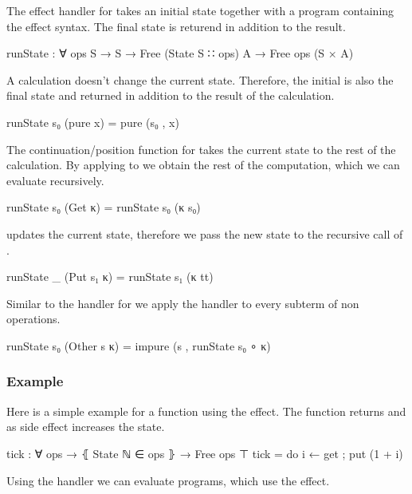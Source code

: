 \begin{AgdaAlign}
The effect handler for  takes an initial state together
with a program containing the effect syntax.
The final state is returend in addition to the result.

\begin{code}
runState : ∀ {ops S} → S → Free (State S ∷ ops) A → Free ops (S × A)
\end{code}
A  calculation doesn't change the current state.
Therefore, the initial is also the final state and returned in addition to the
result of the calculation.
\begin{code}
runState s₀ (pure x)     = pure (s₀ , x)
\end{code}
The continuation/position function for  takes the current
state to the rest of the calculation.
By applying  to  we obtain the rest of the
computation, which we can evaluate recursively.
\begin{code}
runState s₀ (Get κ)      = runState s₀ (κ s₀)
\end{code}
 updates the current state, therefore we pass the new state
 to the recursive call of .
\begin{code}
runState _  (Put s₁ κ)   = runState s₁ (κ tt)
\end{code}
Similar to the handler for  we apply the handler to every
subterm of non  operations.
\begin{code}
runState s₀ (Other s κ)  = impure (s , runState s₀ ∘ κ)
\end{code}
\end{AgdaAlign}

\subsubsection{Example}

Here is a simple example for a function using the 
effect.
The function  returns  and
as side effect increases the state.

\begin{code}
tick : ∀ {ops} → ⦃ State ℕ ∈ ops ⦄ → Free ops ⊤
tick = do i ← get ; put (1 + i)
\end{code}
Using the  handler we can evaluate programs, which use
the  effect.

